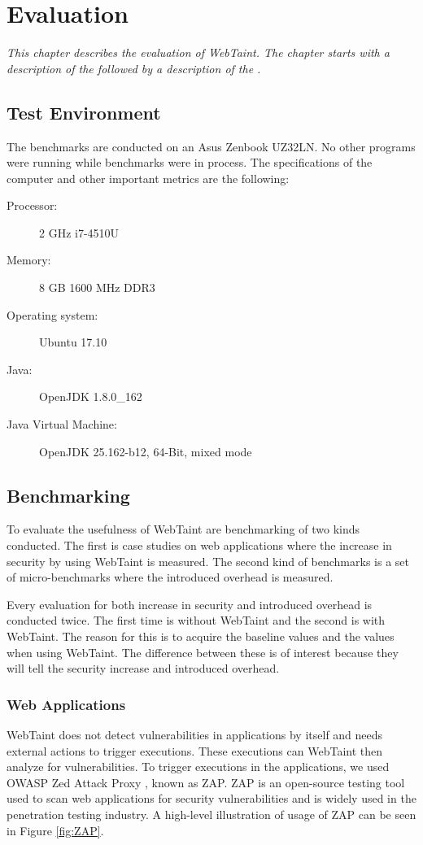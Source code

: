 \chapter{Evaluation}
\label{Evaluation}
\textit{This chapter describes the evaluation of WebTaint. The chapter starts with a description of the \textit{} followed by a description of the \textit{}.}



\section{Test Environment}
\label{TestEnvironment}
The benchmarks are conducted on an Asus Zenbook UZ32LN. No other programs were running while benchmarks were in process. The specifications of the computer and other important metrics are the following:

\begin{description}
    \item [Processor:] 2 GHz i7-4510U
    \item [Memory:] 8 GB 1600 MHz DDR3
    \item [Operating system:] Ubuntu 17.10
    \item [Java:] OpenJDK 1.8.0\_162
    \item [Java Virtual Machine:] OpenJDK 25.162-b12, 64-Bit, mixed mode
\end{description}



\section{Benchmarking}
\label{Benchmarking}
To evaluate the usefulness of WebTaint are benchmarking of two kinds conducted. The first is case studies on web applications where the increase in security by using WebTaint is measured. The second kind of benchmarks is a set of micro-benchmarks where the introduced overhead is measured.

Every evaluation for both increase in security and introduced overhead is conducted twice. The first time is without WebTaint and the second is with WebTaint. The reason for this is to acquire the baseline values and the values when using WebTaint. The difference between these is of interest because they will tell the security increase and introduced overhead.



\subsection{Web Applications}
WebTaint does not detect vulnerabilities in applications by itself and needs external actions to trigger executions. These executions can WebTaint then analyze for vulnerabilities. To trigger executions in the applications, we used OWASP Zed Attack Proxy \parencite{zap}, known as ZAP. ZAP is an open-source testing tool used to scan web applications for security vulnerabilities and is widely used in the penetration testing industry. A high-level illustration of usage of ZAP can be seen in Figure \ref{fig:ZAP}. 

